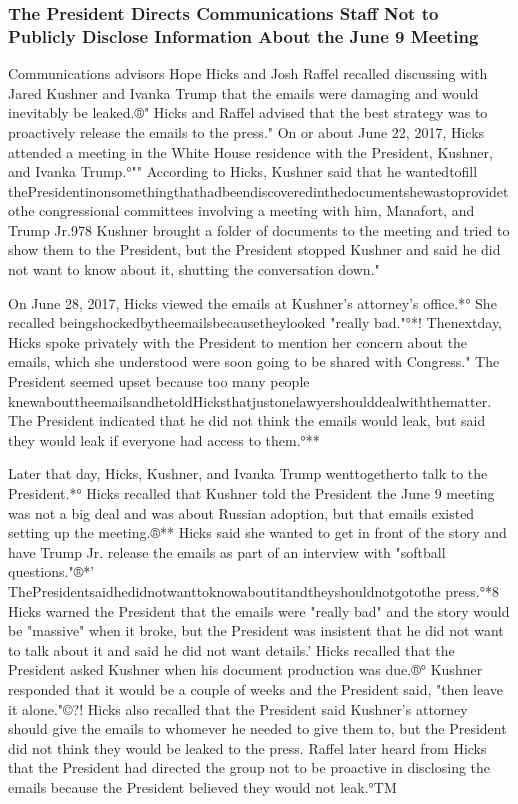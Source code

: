 \subsubsection{The President Directs Communications Staff Not to Publicly Disclose Information About the June 9 Meeting}

Communications advisors Hope Hicks and Josh Raffel recalled discussing with Jared Kushner and Ivanka Trump that the emails were damaging and would inevitably be leaked.®"
Hicks and Raffel advised that the best strategy was to proactively release the emails to the press."
On or about June 22, 2017, Hicks attended a meeting in the White House residence with the President, Kushner, and Ivanka Trump.°""
According to Hicks, Kushner said that he wantedtofill thePresidentinonsomethingthathadbeendiscoveredinthedocumentshewastoprovidetothe congressional committees involving a meeting with him, Manafort, and Trump Jr.978
Kushner brought a folder of documents to the meeting and tried to show them to the President, but the President stopped Kushner and said he did not want to know about it, shutting the conversation down."

On June 28, 2017, Hicks viewed the emails at Kushner's attorney's office.*°
She recalled beingshockedbytheemailsbecausetheylooked "really bad."°*!
Thenextday, Hicks spoke privately with the President to mention her concern about the emails, which she understood were soon going to be shared with Congress."
The President seemed upset because too many people knewabouttheemailsandhetoldHicksthatjustonelawyershoulddealwiththematter.
The President indicated that he did not think the emails would leak, but said they would leak if everyone had access to them.°**

Later that day, Hicks, Kushner, and Ivanka Trump wenttogetherto talk to the President.*°
Hicks recalled that Kushner told the President the June 9 meeting was not a big deal and was about Russian adoption, but that emails existed setting up the meeting.®**
Hicks said she wanted to get in front of the story and have Trump Jr. release the emails as part of an interview with "softball questions."®*'
ThePresidentsaidhedidnotwanttoknowaboutitandtheyshouldnotgotothe press.°*8
Hicks warned the President that the emails were "really bad" and the story would be "massive" when it broke, but the President was insistent that he did not want to talk about it and said he did not want details.'
Hicks recalled that the President asked Kushner when his document production was due.®°
Kushner responded that it would be a couple of weeks and the President said, "then leave it alone."©?!
Hicks also recalled that the President said Kushner's attorney should give the emails to whomever he needed to give them to, but the President did not think they would be leaked to the press.
Raffel later heard from Hicks that the President had directed the group not to be proactive in disclosing the emails because the President believed they would not leak.°TM

